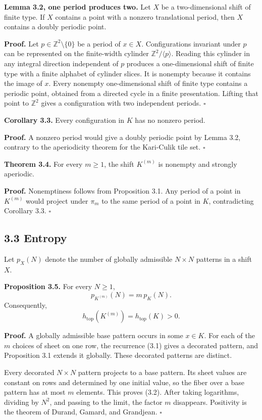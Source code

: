 \documentclass[11pt]{article}
\begin{document}
\textbf{Lemma 3.2, one period produces two.} Let \(X\) be a two-dimensional shift
of finite type. If \(X\) contains a point with a nonzero translational
period, then \(X\) contains a doubly periodic point.

\textbf{Proof.} Let \(p\in\mathbb Z^2\setminus\{0\}\) be a period of
\(x\in X\). Configurations invariant under \(p\) can be represented on the
finite-width cylinder \(\mathbb Z^2/\langle p\rangle\). Reading this cylinder
in any integral direction independent of \(p\) produces a one-dimensional
shift of finite type with a finite alphabet of cylinder slices. It is
nonempty because it contains the image of \(x\). Every nonempty
one-dimensional shift of finite type contains a periodic point, obtained
from a directed cycle in a finite presentation. Lifting that point to
\(\mathbb Z^2\) gives a configuration with two independent periods.
\(\square\)

\textbf{Corollary 3.3.} Every configuration in \(K\) has no nonzero period.

\textbf{Proof.} A nonzero period would give a doubly periodic point by Lemma 3.2,
contrary to the aperiodicity theorem for the Kari-Culik tile set.
\(\square\)

\textbf{Theorem 3.4.} For every \(m\geq1\), the shift \(K^{(m)}\) is nonempty and
strongly aperiodic.

\textbf{Proof.} Nonemptiness follows from Proposition 3.1. Any period of a point
in \(K^{(m)}\) would project under \(\pi_m\) to the same period of a point in
\(K\), contradicting Corollary 3.3. \(\square\)

\subsection*{3.3 Entropy}

Let \(p_X(N)\) denote the number of globally admissible
\(N\times N\) patterns in a shift \(X\).

\textbf{Proposition 3.5.} For every \(N\geq1\),
\[
  p_{K^{(m)}}(N)=m\,p_K(N).
  \tag{3.2}
\]
Consequently,
\[
  h_{\mathrm{top}}(K^{(m)})=h_{\mathrm{top}}(K)>0.
\]

\textbf{Proof.} A globally admissible base pattern occurs in some \(x\in K\).
For each of the \(m\) choices of sheet on one row, the recurrence (3.1)
gives a decorated pattern, and Proposition 3.1 extends it globally. These
decorated patterns are distinct.

Every decorated \(N\times N\) pattern projects to a base pattern. Its sheet
values are constant on rows and determined by one initial value, so the
fiber over a base pattern has at most \(m\) elements. This proves (3.2).
After taking logarithms, dividing by \(N^2\), and passing to the limit, the
factor \(m\) disappears. Positivity is the theorem of Durand, Gamard, and
Grandjean. \(\square\)
\end{document}
